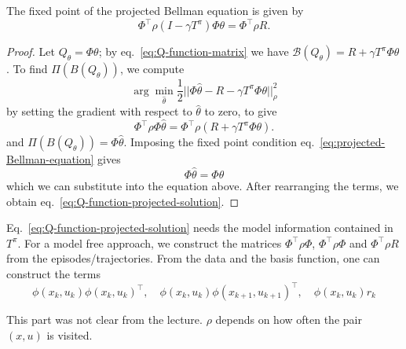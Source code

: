 \begin{theorem}
  The fixed point of the projected Bellman equation is given by
  \begin{equation}
    \label{eq:Q-function-projected-solution}
    \Phi^\top \rho \left(I - \gamma T^\pi\right) \Phi\theta = \Phi^\top\rho R.
  \end{equation}
\end{theorem}
\begin{proof}
  Let $Q_\theta = \Phi \theta$; by eq.~\eqref{eq:Q-function-matrix} we have $\mathcal{B}(Q_\theta) = R + \gamma T^\pi\Phi\theta$. To find $\Pi(B(Q_\theta))$, we compute
  \begin{equation*}
    \arg \min_{\hat{\theta}} \frac{1}{2} |\!| \Phi \hat{\theta} - R - \gamma T^\pi \Phi\theta |\!|^2_\rho
  \end{equation*}
  by setting the gradient with respect to $\hat{\theta}$ to zero, to give
  \begin{equation*}
    \Phi^\top\rho\Phi \hat{\theta} = \Phi^\top\rho\left(R + \gamma T^\pi \Phi\theta\right).
  \end{equation*}
  and  $\Pi(B(Q_\theta)) = \Phi\hat{\theta}$. Imposing the fixed point condition eq.~\eqref{eq:projected-Bellman-equation} gives
  \begin{equation*}
    \Phi\hat{\theta} = \Phi\theta
  \end{equation*}
  which we can substitute into the equation above. After rearranging the terms, we obtain eq.~\eqref{eq:Q-function-projected-solution}.
\end{proof}

Eq.~\eqref{eq:Q-function-projected-solution} needs the model information contained in $T^\pi$. For a model free approach, we construct the matrices $\Phi^\top\rho \Phi$, $\Phi^\top\rho \Phi$ and $\Phi^\top\rho R$ from the episodes/trajectories. From the data and the basis function, one can construct the terms
\begin{equation*}
  \phi(x_k,u_k)\phi(x_k,u_k)^\top,\quad \phi(x_k,u_k)\phi(x_{k+1},u_{k+1})^\top,\quad \phi(x_k,u_k)r_k
\end{equation*}

This part was not clear from the lecture. $\rho$ depends on how often the pair $(x,u)$ is visited.


